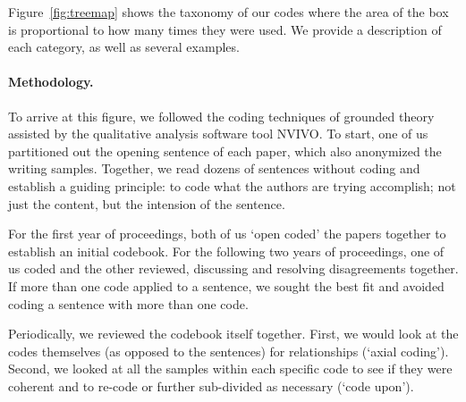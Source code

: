 \documentclass[sigconf]{acmart}
\newcommand{\etc}{\textit{etc.}\xspace}
\newcommand{\eg}{\textit{e.g.,}\xspace}
\begin{document}
	Figure~\ref{fig:treemap} shows the taxonomy of our codes where the area of the box is proportional to how many times they were used. We provide a description of each category, as well as several examples.

\paragraph{Methodology.}

To arrive at this figure, we followed the coding techniques of grounded theory assisted by the qualitative analysis software tool NVIVO. To start, one of us partitioned out the opening sentence of each paper, which also anonymized the writing samples. Together, we read dozens of sentences without coding and establish a guiding principle: to code what the authors are trying accomplish; not just the content, but the intension of the sentence.

For the first year of proceedings, both of us `open coded' the papers together to establish an initial codebook. For the following two years of proceedings, one of us coded and the other reviewed, discussing and resolving disagreements together. If more than one code applied to a sentence, we sought the best fit and avoided coding a sentence with more than one code.

Periodically, we reviewed the codebook itself together. First, we would look at the codes themselves (as opposed to the sentences) for relationships (`axial coding'). Second, we looked at all the samples within each specific code to see if they were coherent and to re-code or further sub-divided as necessary (`code upon'). 



\end{document}
